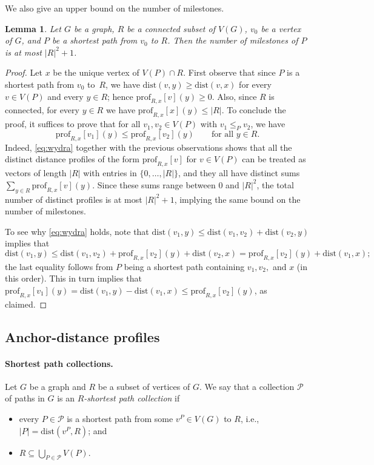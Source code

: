 \documentclass[11pt,a4paper]{article}
\newtheorem{lemma}{Lemma}[section]
\newcommand{\distprofile}[3]{\mathrm{prof}_{#1,#2}[#3]}
\newcommand{\dist}{\mathrm{dist}}
\renewcommand{\leq}{\leqslant}
\renewcommand{\le}{\leqslant}
\renewcommand{\ge}{\geqslant}
\begin{document}
We also give an upper bound on the number of milestones.

\begin{lemma}
  \label{lem:mile}
  Let $G$ be a graph, $R$ be a connected subset of $V(G)$, $v_0$ be a vertex of $G$, and $P$ be a shortest path from $v_0$ to $R$. Then the number of milestones of $P$ is at most $|R|^2+1$.
\end{lemma}
\begin{proof}
  Let $x$ be the unique vertex of $V(P)\cap R$.
  First observe that since $P$ is a shortest path from $v_0$ to~$R$, we have $\dist(v,y)\ge \dist(v,x)$ for every $v\in V(P)$ and every $y\in R$; hence $\distprofile{R}{x}{v}(y)\ge 0$.
  Also, since $R$ is connected, for every $y\in R$ we have $\distprofile{R}{x}{x}(y)\le |R|$.
  To conclude the proof, it suffices to prove that for all $v_1,v_2\in V(P)$ with $v_1\leq_P v_2$, we have \begin{equation}\label{eq:wydra}\distprofile{R}{x}{v_1}(y)\le \distprofile{R}{x}{v_2}(y)\qquad\textrm{for all }y\in R.\end{equation}
  Indeed, \eqref{eq:wydra} together with the previous observations shows that all the distinct distance profiles of the form $\distprofile{R}{x}{v}$ for $v\in V(P)$ can be treated as vectors of length $|R|$ with entries in $\{0,\ldots,|R|\}$, and they all have distinct sums $\sum_{y\in R} \distprofile{R}{x}{v}(y)$. Since these sums range between $0$ and $|R|^2$, the total number of distinct profiles is at most $|R|^2+1$, implying the same bound on the number of milestones.

  To see why \eqref{eq:wydra} holds, note that $\dist(v_1,y)\le \dist(v_1,v_2)+\dist(v_2,y)$ implies that $$\dist(v_1,y)\le \dist(v_1,v_2)+\distprofile{R}{x}{v_2}(y)+\dist(v_2,x)=\distprofile{R}{x}{v_2}(y) + \dist(v_1,x);$$
  the last equality follows from $P$ being a shortest path containing $v_1,v_2,$ and $x$ (in this order). This in turn implies that
  $\distprofile{R}{x}{v_1}(y)=\dist(v_1,y)-\dist(v_1,x)\le \distprofile{R}{x}{v_2}(y)$, as claimed.
\end{proof}


\subsection{Anchor-distance profiles}
\label{subsec:mdprofiles}

\paragraph{Shortest path collections.}
Let $G$ be a graph and $R$ be a subset of vertices of $G$.
We say that a collection $\mathcal{P}$ of paths in $G$
is an \emph{$R$-shortest path collection} if
\begin{itemize}[nosep]
  \item every $P \in \mathcal{P}$ is a shortest path from some $v^P \in V(G)$ to $R$, i.e., $|P|=\dist(v^P,R)$; and
  \item $R \subseteq \bigcup_{P \in \mathcal{P}} V(P)$.
\end{itemize}
\end{document}
